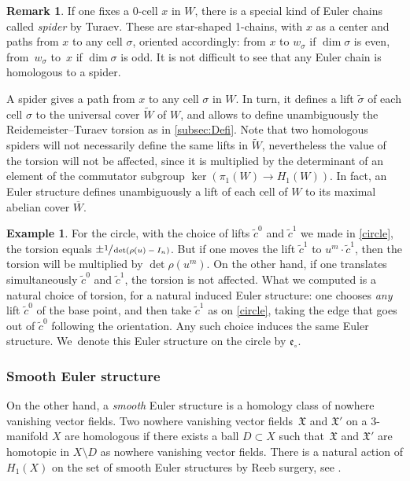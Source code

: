 \documentclass[10pt]{amsart}
\theoremstyle{plain}
\theoremstyle{definition}
\newtheorem{rmrk}[thm]{Remark}
\newtheorem{example}[thm]{Example}
\theoremstyle{remark}
\numberwithin{equation}{section}
\begin{document}
\begin{rmrk}
If one fixes a $0$-cell $x$ in $W$, there is a special kind of Euler chains called \emph{spider} by Turaev. These are star-shaped 1-chains, with $x$ as a center and paths from $x$ to any cell $\sigma$, oriented accordingly: from $x$ to $w_\sigma$ if $\dim \sigma$ is even, from~$w_\sigma$ to~$x$ if $\dim \sigma$ is odd. It is not difficult to see that any Euler chain is homologous to a spider.

A spider gives a path from $x$ to any cell $\sigma$ in $W$. In turn, it defines a lift $\widetilde \sigma$ of each cell
$\sigma$ to the universal cover $\widetilde W$ of $W$, and allows to define unambiguously the Reidemeister--Turaev torsion as in \cref{subsec:Defi}. Note that two homologous spiders will not necessarily define the same lifts in $\widetilde W$, nevertheless the value of the torsion will not be affected, since it is multiplied by the determinant of an element of the commutator subgroup $\ker(\pi_1(W) \to H_1(W))$. In fact, an Euler structure defines unambiguously a lift of each cell of $W$ to its maximal abelian cover $\overline W$.
\end{rmrk}

\begin{example}\label{ex:circle2}
For the circle, with the choice of lifts $\widetilde c^0$ and $\widetilde c^1$ we made in \cref{circle}, the torsion equals $\pm \sfrac 1 {\det(\rho(u)-I_n)}$. But if one moves the lift $\widetilde c^1$ to $u^m \cdot \widetilde c^1$, then the torsion will be multiplied by $\det \rho(u^m)$.
On the other hand, if one translates {simultaneously} $\widetilde c^0$ and $\widetilde c^1$, the torsion is not affected.
What we computed is a natural choice of torsion, for a natural induced Euler structure: one chooses \emph{any} lift $\widetilde c^0$ of the base point, and then take $\widetilde c^1$ as on \cref{circle}, taking the edge that goes out of $\widetilde c^0$ following the orientation. Any such choice induces the same Euler structure.
We~denote this Euler structure on the circle by $\mathfrak e_{\circ}$.
\end{example}

\subsubsection{Smooth Euler structure}
On the other hand, a \emph{smooth} Euler structure is a homology class of nowhere vanishing vector fields. Two nowhere vanishing vector fields~$\mathfrak X$ and $\mathfrak X'$ on a 3\nobreakdash-manifold $X$ are homologous if there exists a ball $D \subset X$ such that~$\mathfrak X$ and $\mathfrak X'$ are homotopic in $X \setminus D$ as nowhere vanishing vector fields. There is a natural action of $H_1(X)$ on the set of smooth Euler structures by Reeb surgery, see \cite[\S I.4.2]{Turaev_tors}.
\end{document}
